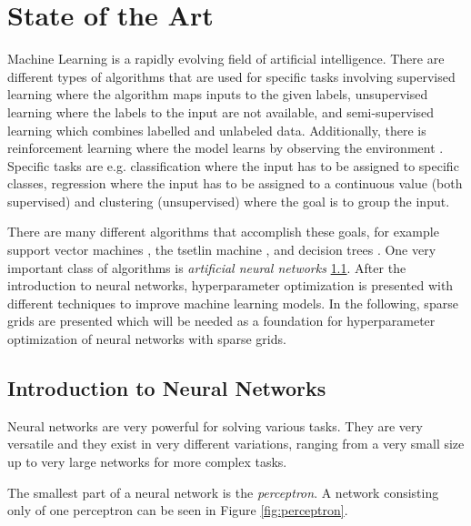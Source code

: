 
\chapter{State of the Art}\label{chapter:theoretical_background}

Machine Learning \cite{wang2016machine, mahesh2020machine} is a rapidly evolving field of artificial intelligence. There are different types of algorithms that are used for specific tasks involving supervised learning where the algorithm maps inputs to the given labels, unsupervised learning where the labels to the input are not available, and semi-supervised learning which combines labelled and unlabeled data. Additionally, there is reinforcement learning where the model learns by observing the environment \cite{ayodele2010types}. Specific tasks are e.g. classification where the input has to be assigned to specific classes, regression where the input has to be assigned to a continuous value (both supervised) and clustering (unsupervised) where the goal is to group the input. 

There are many different algorithms that accomplish these goals, for example support vector machines \cite{noble2006support}, the tsetlin machine \cite{granmo2018tsetlin}, and decision trees \cite{rokach2005decision}. One very important class of algorithms is \textit{artificial neural networks} \ref{sec:neural_networks}. After the introduction to neural networks, hyperparameter optimization is presented with different techniques to improve machine learning models. In the following, sparse grids are presented which will be needed as a foundation for hyperparameter optimization of neural networks with sparse grids. 

\section{Introduction to Neural Networks}\label{sec:neural_networks}

Neural networks \cite{bishop1994neural, da2017artificial} are very powerful for solving various tasks. They are very versatile and they exist in very different variations, ranging from a very small size up to very large networks for more complex tasks.

The smallest part of a neural network is the \textit{perceptron}. A network consisting only of one perceptron can be seen in Figure \ref{fig:perceptron}.

